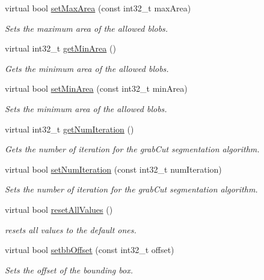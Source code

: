 \begin{DoxyCompactItemize}
virtual bool \hyperlink{classlbpExtract__IDLServer_a81dbd91a1460cdb450a7f7824e6d9953}{set\+Max\+Area} (const int32\+\_\+t max\+Area)
\begin{DoxyCompactList}\small\item\em Sets the maximum area of the allowed blobs. \end{DoxyCompactList}\item 
virtual int32\+\_\+t \hyperlink{classlbpExtract__IDLServer_a3f6f2aba33eeb0a15d73fdfc5817ef7a}{get\+Min\+Area} ()
\begin{DoxyCompactList}\small\item\em Gets the minimum area of the allowed blobs. \end{DoxyCompactList}\item 
virtual bool \hyperlink{classlbpExtract__IDLServer_a13eb918e54b2eee6fe2811fbe8f6aee6}{set\+Min\+Area} (const int32\+\_\+t min\+Area)
\begin{DoxyCompactList}\small\item\em Sets the minimum area of the allowed blobs. \end{DoxyCompactList}\item 
virtual int32\+\_\+t \hyperlink{classlbpExtract__IDLServer_a48094f72a89aa3218e3449dfe071f0f7}{get\+Num\+Iteration} ()
\begin{DoxyCompactList}\small\item\em Gets the number of iteration for the grab\+Cut segmentation algorithm. \end{DoxyCompactList}\item 
virtual bool \hyperlink{classlbpExtract__IDLServer_a2955fa69c12b59a03c2b1e130747b054}{set\+Num\+Iteration} (const int32\+\_\+t num\+Iteration)
\begin{DoxyCompactList}\small\item\em Sets the number of iteration for the grab\+Cut segmentation algorithm. \end{DoxyCompactList}\item 
virtual bool \hyperlink{classlbpExtract__IDLServer_a88f2492af4a66eaf9be8ceb28c862fe5}{reset\+All\+Values} ()
\begin{DoxyCompactList}\small\item\em resets all values to the default ones. \end{DoxyCompactList}\item 
virtual bool \hyperlink{classlbpExtract__IDLServer_aebf9bfaa7a16309244177c4b7b094e2a}{setbb\+Offset} (const int32\+\_\+t offset)
\begin{DoxyCompactList}\small\item\em Sets the offset of the bounding box. \end{DoxyCompactList}\item 

\end{DoxyCompactItemize}
